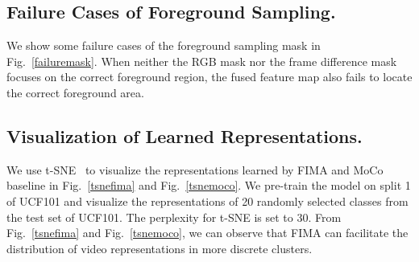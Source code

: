 \documentclass[sigconf,screen]{acmart}
\begin{document}
\subsection{Failure Cases of Foreground Sampling.} We show some failure cases of the foreground sampling mask in Fig.~\ref{failuremask}. When neither the RGB mask nor the frame difference mask focuses on the correct foreground region, the fused feature map also fails to locate the correct foreground area.

\subsection{Visualization of Learned Representations.} We use t-SNE~\cite{tsne} to visualize the representations learned by FIMA and MoCo baseline in Fig.~\ref{tsnefima} and Fig.~\ref{tsnemoco}. We pre-train the model on split 1 of UCF101 and visualize the representations of 20 randomly selected classes from the test set of UCF101. The perplexity for t-SNE is set to 30. From Fig.~\ref{tsnefima} and Fig.~\ref{tsnemoco}, we can observe that FIMA can facilitate the distribution of video representations in more discrete clusters.


\end{document}
